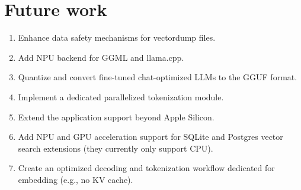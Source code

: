 \section{Future work}
\label{sec:FutureWork}
\begin{enumerate}[label=\alph*.]
    \item Enhance data safety mechanisms for vectordump files.
    \item Add NPU backend for GGML and llama.cpp.
    \item Quantize and convert fine-tuned chat-optimized LLMs to the GGUF format.
    \item Implement a dedicated parallelized tokenization module.
    \item Extend the application support beyond Apple Silicon.
    \item Add NPU and GPU acceleration support for SQLite and Postgres vector search extensions (they currently only support CPU).
    \item Create an optimized decoding and tokenization workflow dedicated for embedding (e.g., no KV cache).
\end{enumerate}